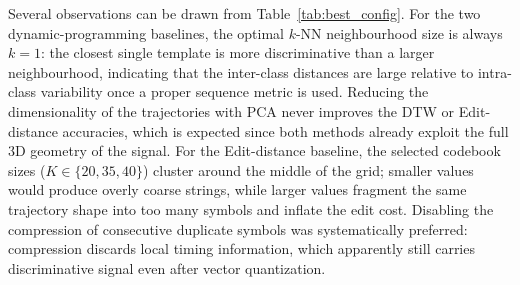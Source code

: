 \begin{table}[H]
\centering
\caption{Best hyperparameter configurations selected by inner-validation,
per method, domain and CV protocol. ``--'' means the hyperparameter does not
apply.}
\label{tab:best_config}
\end{table}

Several observations can be drawn from Table~\ref{tab:best_config}. For the
two dynamic-programming baselines, the optimal $k$-NN neighbourhood size is
always $k = 1$: the closest single template is more discriminative than a
larger neighbourhood, indicating that the inter-class distances are large
relative to intra-class variability once a proper sequence metric is used.
Reducing the dimensionality of the trajectories with PCA never improves the
DTW or Edit-distance accuracies, which is expected since both methods already
exploit the full 3D geometry of the signal. For the Edit-distance baseline,
the selected codebook sizes ($K \in \{20, 35, 40\}$) cluster around the middle
of the grid; smaller values would produce overly coarse strings, while larger
values fragment the same trajectory shape into too many symbols and inflate
the edit cost. Disabling the compression of consecutive duplicate symbols was
systematically preferred: compression discards local timing information,
which apparently still carries discriminative signal even after vector
quantization.

